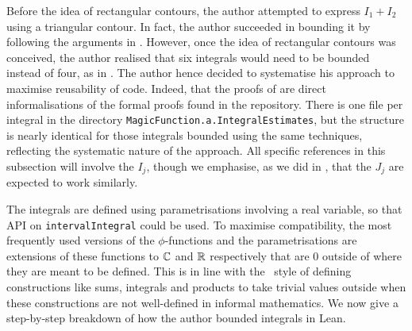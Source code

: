 Before the idea of rectangular contours, the author attempted to express $I_1 + I_2$ using a triangular contour. In fact, the author succeeded in bounding it by following the arguments in \cite{Viazovska8}. However, once the idea of rectangular contours was conceived, the author realised that six integrals would need to be bounded instead of four, as in \cite{Viazovska8}. The author hence decided to systematise his approach to maximise reusability of code. Indeed, that the proofs of  are direct informalisations of the formal proofs found in the repository. There is one file per integral in the directory \lstinline|MagicFunction.a.IntegralEstimates|, but the structure is nearly identical for those integrals bounded using the same techniques, reflecting the systematic nature of the approach. All specific references in this subsection will involve the $I_j$, though we emphasise, as we did in , that the $J_j$ are expected to work similarly.

The integrals are defined using parametrisations involving a real variable, so that API on \lstinline|intervalIntegral| could be used. To maximise compatibility, the most frequently used versions of the $\phi$-functions and the parametrisations are extensions of these functions to $\mathbb{C}$ and $\mathbb{R}$ respectively that are $0$ outside of where they are meant to be defined. This is in line with the \mathlib\ style of defining constructions like sums, integrals and products to take trivial values outside when these constructions are not well-defined in informal mathematics. We now give a step-by-step breakdown of how the author bounded integrals in Lean.

